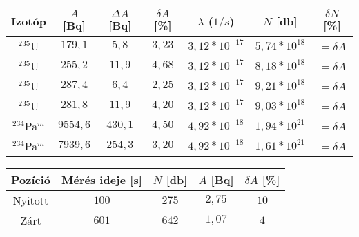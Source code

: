 \begin{center}
\begin{tabular}{|c|c|c|c|c|c|c|}
\hline
Izotóp 			 & $A$ [Bq]  & $\Delta A$ [Bq] & $\delta A$ [\%] & $\lambda$ ($1/s$) & $N$ [db]         & $\delta N$ [\%] \\
\hline
$^{235}$U 		 & $179,1$   & $5,8$ 	       & $3,23$          & $3,12 * 10^{-17}$  & $5,74 * 10^{18}$ & $=\delta A$ \\
$^{235}$U 		 & $255,2$   & $11,9$ 		   & $4,68$          & $3,12 * 10^{-17}$  & $8,18 * 10^{18}$ & $=\delta A$ \\
$^{235}$U 		 & $287,4$   & $6,4$           & $2,25$          & $3,12 * 10^{-17}$  & $9,21 * 10^{18}$ & $=\delta A$ \\
$^{235}$U        & $281,8$   & $11,9$          & $4,20$          & $3,12 * 10^{-17}$  & $9,03 * 10^{18}$ & $=\delta A$ \\
$^{234}$Pa$^{m}$ & $9554,6$  & $430,1$         & $4,50$          & $4,92 * 10^{-18}$  & $1,94 * 10^{21}$ & $=\delta A$ \\
$^{234}$Pa$^{m}$ & $7939,6$  & $254,3$ 		   & $3,20$          & $4,92 * 10^{-18}$  & $1,61 * 10^{21}$ & $=\delta A$ \\
\hline
\end{tabular}
 \label{table:4}
\end{center}

\begin{center}
\begin{tabular}{|c|c|c|c|c|}
\hline
Pozíció & Mérés ideje [s]   & $N$ [db]   & $A$ [Bq]   & $\delta A$ [\%] \\
\hline
Nyitott & $100$             & $275$      & $2,75$     & $10$ \\
\hline
Zárt    & $601$             & $642$      & $1,07$     & $4$ \\
\hline
\end{tabular}
 \label{table:5}
\end{center}